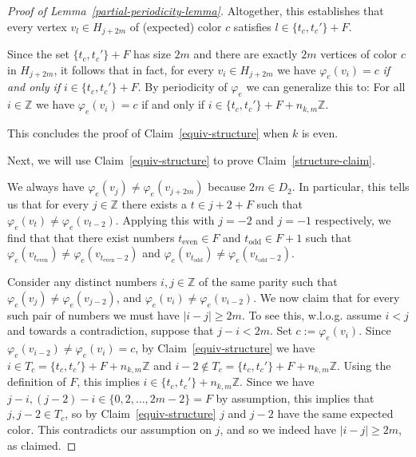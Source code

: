 \documentclass[a4paper,10pt,hidelinks]{amsart}
\renewcommand{\phi}{\ensuremath{\varphi}}
\newenvironment{claimproof}[1][\proofname]{\proof[#1]\renewcommand{\qedsymbol}{$\blacksquare$}}{\endproof}
\theoremstyle{definition}
\begin{document}
\begin{proof}[Proof of Lemma~\ref{partial-periodicity-lemma}]
\begin{claimproof}[Proof of Claim~\ref{equiv-structure}]
        Altogether, this establishes that every vertex $v_l\in H_{j+2m}$ of (expected) color $c$ satisfies $l\in \{t_c,t_c'\}+F$.
        
        Since the set $\{t_c,t_c'\}+F$ has size $2m$ and there are exactly $2m$ vertices of color $c$ in $H_{j+2m}$, it follows that in fact, for every $v_i\in H_{j+2m}$ we have $\phi_e(v_i)=c$ \emph{if and only if} $i\in \{t_c,t_c'\}+F$. By periodicity of $\varphi_e$ we can generalize this to: For all $i \in \mathbb{Z}$ we have $\varphi_e(v_i) = c$ if and only if $i \in \{t_c, t_c'\} + F + n_{k,m}\mathbb{Z}$.

        This concludes the proof of Claim~\ref{equiv-structure} when $k$ is even.
    \end{claimproof} 

    Next, we will use Claim~\ref{equiv-structure} to prove Claim~\ref{structure-claim}.

    \begin{claimproof}[Proof of Claim~\ref{structure-claim}]        
        We always have $\varphi_e(v_j) \neq \varphi_e(v_{j + 2m})$ because $2m \in D_2$. In particular, this tells us that for every $j \in \mathbb{Z}$ there exists a $t\in j + 2 + F$ such that $\varphi_e(v_t) \neq \varphi_e(v_{t - 2})$. Applying this with $j=-2$ and $j=-1$ respectively, we find that that there exist numbers $t_{\text{even}}\in F$ and $t_{\text{odd}}\in F+1$ such that $\varphi_e(v_{t_{\text{even}}})\neq \varphi_e(v_{t_{\text{even}}-2})$ and $\varphi_e(v_{t_{\text{odd}}})\neq \varphi_e(v_{t_{\text{odd}}-2})$.
        
        Consider any distinct numbers $i, j \in \mathbb{Z}$ of the same parity such that $\varphi_e(v_j) \neq \varphi_e(v_{j - 2})$, and $\varphi_e(v_i) \neq \varphi_e(v_{i - 2})$. We now claim that for every such pair of numbers we must have $|i - j| \geq 2m$. To see this, w.l.o.g. assume $i < j$ and towards a contradiction, suppose that $j - i < 2m$. Set $c:=\varphi_e(v_i)$. Since $\varphi_e(v_{i - 2})\neq \varphi_e(v_i)=c$, by Claim~\ref{equiv-structure} we have $i\in T_c=\{t_c,t_c'\}+F+n_{k,m}\mathbb{Z}$ and $i-2\notin T_c=\{t_c,t_c'\}+F+n_{k,m}\mathbb{Z}$. Using the definition of $F$, this implies $i \in \{t_c, t_c'\} + n_{k,m}\mathbb{Z}$. Since we have $j-i, (j-2)-i\in \{0,2,\ldots,2m-2\}=F$ by assumption, this implies that $j, j-2 \in T_c$, so by Claim~\ref{equiv-structure} $j$ and $j - 2$ have the same expected color. This contradicts our assumption on $j$, and so we indeed have $|i - j| \geq 2m$, as claimed.


\end{claimproof}
\end{proof}
\end{document}
